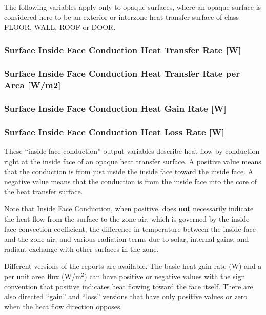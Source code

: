 The following variables apply only to opaque surfaces, where an opaque surface is considered here to be an exterior or interzone heat transfer surface of class FLOOR, WALL, ROOF or DOOR.

\subsubsection{Surface Inside Face Conduction Heat Transfer Rate {[}W{]}}\label{surface-inside-face-conduction-heat-transfer-rate-w}

\subsubsection{Surface Inside Face Conduction Heat Transfer Rate per Area {[}W/m2{]}}\label{surface-inside-face-conduction-heat-transfer-rate-per-area-wm2}

\subsubsection{Surface Inside Face Conduction Heat Gain Rate {[}W{]}}\label{surface-inside-face-conduction-heat-gain-rate-w}

\subsubsection{Surface Inside Face Conduction Heat Loss Rate {[}W{]}}\label{surface-inside-face-conduction-heat-loss-rate-w}

These ``inside face conduction'' output variables describe heat flow by conduction right at the inside face of an opaque heat transfer surface. A positive value means that the conduction is from just inside the inside face toward the inside face. A negative value means that the conduction is from the inside face into the core of the heat transfer surface.

Note that Inside Face Conduction, when positive, does \textbf{not} necessarily indicate the heat flow from the surface to the zone air, which is governed by the inside face convection coefficient, the difference in temperature between the inside face and the zone air, and various radiation terms due to solar, internal gains, and radiant exchange with other surfaces in the zone.

Different versions of the reports are available. The basic heat gain rate (W) and a per unit area flux (W/m\(^{2}\)) can have positive or negative values with the sign convention that positive indicates heat flowing toward the face itself. There are also directed ``gain'' and ``loss'' versions that have only positive values or zero when the heat flow direction opposes.

